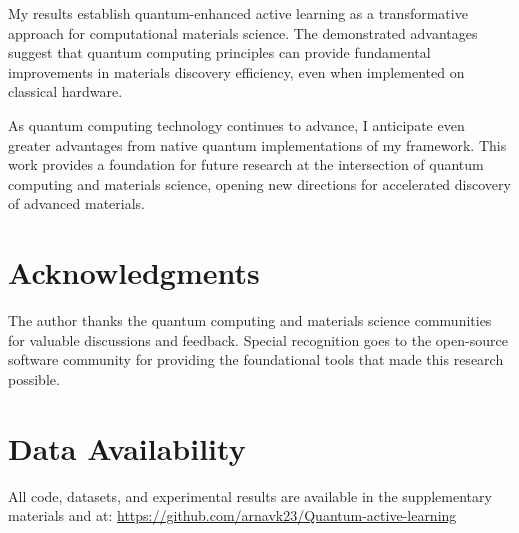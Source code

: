 \documentclass{article}
\begin{document}
My results establish quantum-enhanced active learning as a transformative approach for computational materials science. The demonstrated advantages suggest that quantum computing principles can provide fundamental improvements in materials discovery efficiency, even when implemented on classical hardware.

As quantum computing technology continues to advance, I anticipate even greater advantages from native quantum implementations of my framework. This work provides a foundation for future research at the intersection of quantum computing and materials science, opening new directions for accelerated discovery of advanced materials.

\section*{Acknowledgments}

The author thanks the quantum computing and materials science communities for valuable discussions and feedback. Special recognition goes to the open-source software community for providing the foundational tools that made this research possible.

\section*{Data Availability}

All code, datasets, and experimental results are available in the supplementary materials and at: \url{https://github.com/arnavk23/Quantum-active-learning}
\end{document}
